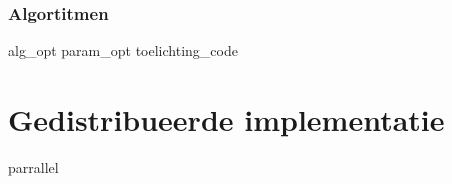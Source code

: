 

\section{Algortitmen}








 {alg_opt}
 {param_opt}
 {toelichting_code}

\part{Gedistribueerde implementatie}

 {parrallel}




